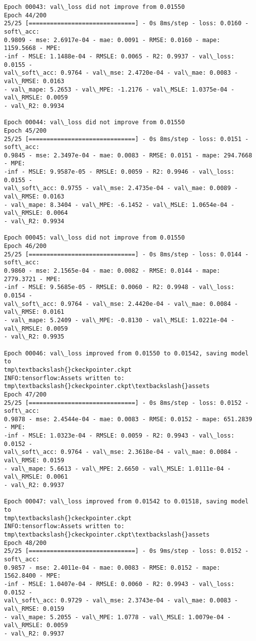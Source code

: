 \documentclass[11pt]{article}
\begin{document}
\begin{Verbatim}[commandchars=\\\{\}]
Epoch 00043: val\_loss did not improve from 0.01550
Epoch 44/200
25/25 [==============================] - 0s 8ms/step - loss: 0.0160 - soft\_acc:
0.9809 - mse: 2.6917e-04 - mae: 0.0091 - RMSE: 0.0160 - mape: 1159.5668 - MPE:
-inf - MSLE: 1.1488e-04 - RMSLE: 0.0065 - R2: 0.9937 - val\_loss: 0.0155 -
val\_soft\_acc: 0.9764 - val\_mse: 2.4720e-04 - val\_mae: 0.0083 - val\_RMSE: 0.0163
- val\_mape: 5.2653 - val\_MPE: -1.2176 - val\_MSLE: 1.0375e-04 - val\_RMSLE: 0.0059
- val\_R2: 0.9934

Epoch 00044: val\_loss did not improve from 0.01550
Epoch 45/200
25/25 [==============================] - 0s 8ms/step - loss: 0.0151 - soft\_acc:
0.9845 - mse: 2.3497e-04 - mae: 0.0083 - RMSE: 0.0151 - mape: 294.7668 - MPE:
-inf - MSLE: 9.9587e-05 - RMSLE: 0.0059 - R2: 0.9946 - val\_loss: 0.0155 -
val\_soft\_acc: 0.9755 - val\_mse: 2.4735e-04 - val\_mae: 0.0089 - val\_RMSE: 0.0163
- val\_mape: 8.3404 - val\_MPE: -6.1452 - val\_MSLE: 1.0654e-04 - val\_RMSLE: 0.0064
- val\_R2: 0.9934

Epoch 00045: val\_loss did not improve from 0.01550
Epoch 46/200
25/25 [==============================] - 0s 8ms/step - loss: 0.0144 - soft\_acc:
0.9860 - mse: 2.1565e-04 - mae: 0.0082 - RMSE: 0.0144 - mape: 2779.3721 - MPE:
-inf - MSLE: 9.5685e-05 - RMSLE: 0.0060 - R2: 0.9948 - val\_loss: 0.0154 -
val\_soft\_acc: 0.9764 - val\_mse: 2.4420e-04 - val\_mae: 0.0084 - val\_RMSE: 0.0161
- val\_mape: 5.2409 - val\_MPE: -0.8130 - val\_MSLE: 1.0221e-04 - val\_RMSLE: 0.0059
- val\_R2: 0.9935

Epoch 00046: val\_loss improved from 0.01550 to 0.01542, saving model to
tmp\textbackslash{}ckeckpointer.ckpt
INFO:tensorflow:Assets written to: tmp\textbackslash{}ckeckpointer.ckpt\textbackslash{}assets
Epoch 47/200
25/25 [==============================] - 0s 8ms/step - loss: 0.0152 - soft\_acc:
0.9878 - mse: 2.4544e-04 - mae: 0.0083 - RMSE: 0.0152 - mape: 651.2839 - MPE:
-inf - MSLE: 1.0323e-04 - RMSLE: 0.0059 - R2: 0.9943 - val\_loss: 0.0152 -
val\_soft\_acc: 0.9764 - val\_mse: 2.3618e-04 - val\_mae: 0.0084 - val\_RMSE: 0.0159
- val\_mape: 5.6613 - val\_MPE: 2.6650 - val\_MSLE: 1.0111e-04 - val\_RMSLE: 0.0061
- val\_R2: 0.9937

Epoch 00047: val\_loss improved from 0.01542 to 0.01518, saving model to
tmp\textbackslash{}ckeckpointer.ckpt
INFO:tensorflow:Assets written to: tmp\textbackslash{}ckeckpointer.ckpt\textbackslash{}assets
Epoch 48/200
25/25 [==============================] - 0s 9ms/step - loss: 0.0152 - soft\_acc:
0.9857 - mse: 2.4011e-04 - mae: 0.0083 - RMSE: 0.0152 - mape: 1562.8400 - MPE:
-inf - MSLE: 1.0407e-04 - RMSLE: 0.0060 - R2: 0.9943 - val\_loss: 0.0152 -
val\_soft\_acc: 0.9729 - val\_mse: 2.3743e-04 - val\_mae: 0.0083 - val\_RMSE: 0.0159
- val\_mape: 5.2055 - val\_MPE: 1.0778 - val\_MSLE: 1.0079e-04 - val\_RMSLE: 0.0059
- val\_R2: 0.9937


\end{Verbatim}
\end{document}
